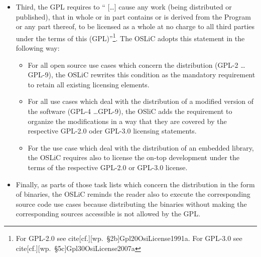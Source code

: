 \begin{itemize}
\begin{itemize}
    \item Third, the GPL requires to \enquote{ [\ldots] cause any work (being
    distributed or published), that in whole or in part contains or is derived
    from the Program or any part thereof, to be licensed as a whole at no charge
    to all third parties under the terms of this (GPL)}\footnote{For GPL-2.0 see
    cite[cf.][\nopage wp.\ §2b]{Gpl20OsiLicense1991a}. For GPL-3.0 see
    cite[cf.][\nopage wp.\ §5c]{Gpl30OsiLicense2007a}}. The OSLiC adopts this
    statement in the following way:
    \begin{itemize}
      \item For all open source use cases which concern the distribution (GPL-2
      \ldots GPL-9), the OSLiC rewrites this condition as the mandatory
      requirement to retain all existing licensing elements.
      
      \item For all use cases which deal with the distribution of a modified
      version of the software (GPL-4 \ldots GPL-9), the OSliC adds the
      requirement to organize the modifications in a way that they are covered
      by the respective GPL-2.0 oder GPL-3.0 licensing statements.
      
      \item For the use case which deal with the distribution of an embedded
      library, the OSLiC requires also to license the on-top development under
      the terms of the respective GPL-2.0 or GPL-3.0 license.
    \end{itemize}
   
    \item Finally, as parts of those task lists which concern the distribution
    in the form of binaries, the OSLiC reminds the reader also to execute the
    corresponding source code use cases because distributing the binaries
    without making the corresponding sources accessible is not allowed by the
    GPL.
  \end{itemize}
  

\end{itemize}





%
